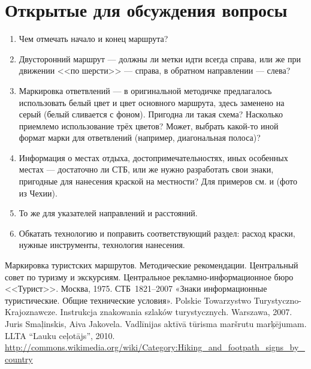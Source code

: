 \documentclass[a4paper,12pt,titlepage]{extarticle}
\begin{document}
\section{Открытые для обсуждения вопросы}
\begin{enumerate}
	\item Чем отмечать начало и конец маршрута?
	\item Двусторонний маршрут --- должны ли метки идти всегда справа, или же при движении <<по шерсти>> --- справа, в обратном направлении --- слева?
	\item Маркировка ответвлений --- в оригинальной методичке предлагалось использовать белый цвет и цвет основного маршрута, здесь заменено на серый (белый сливается с фоном). Пригодна ли такая схема? Насколько приемлемо использование трёх цветов? Может, выбрать какой-то иной формат марки для ответвлений (например, диагональная полоса)?
	\item Информация о местах отдыха, достопримечательностях, иных особенных местах --- достаточно ли СТБ, или же нужно разработать свои знаки, пригодные для нанесения краской на местности? Для примеров см. \cite{metodussr} и \cite{wikimedia-marks} (фото из Чехии).
	\item То же для указателей направлений и расстояний.
	\item Обкатать технологию и поправить соответствующий раздел: расход краски, нужные инструменты, технология нанесения.
\end{enumerate}

\begin{thebibliography}{99}
	 Маркировка туристских маршрутов. Методические рекомендации. Центральный совет по туризму и
		экскурсиям. Центральное рекламно-информационное бюро <<Турист>>. Москва, 1975.
	 СТБ~1821--2007 «Знаки информационные туристические. Общие технические условия».
	 Polskie Towarzystwo Turystyczno-Krajoznawcze. Instrukcja znakowania szlaków turystycznych. Warszawa, 2007.
	 Juris Smaļinskis, Aiva Jakovela. Vadlīnijas aktīvā tūrisma maršrutu marķējumam. LLTA “Lauku ceļotājs”, 2010.
	 \url{http://commons.wikimedia.org/wiki/Category:Hiking\_and\_footpath\_signs\_by\_country}

\end{thebibliography}
\end{document}
